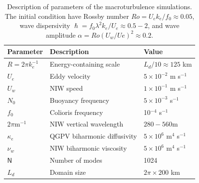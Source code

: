 \documentclass{jfm}
\begin{document}
 \begin{table}
  \begin{center}
    \caption{Description of parameters of the macroturbulence simulations.
             The initial condition have Rossby number $Ro = U_e k_e/f_0 \approx
             0.05$, wave dispersivity $\hslash = f_0\lambda^2k_e/U_e
             \approx 0.5-2$, and wave amplitude $\alpha = Ro (U_w/Ue)^2 \approx 0.2$.}
    \label{parameters_turb}
    \begin{tabular}{ l | l | l }
      \hline
       Parameter & Description & Value \\
       \hline
       $R= 2\pi k_e^{-1}$ & Energy-containing scale & $L_d/10 \approx 125$ km \\
       $U_e$ & Eddy velocity & $5\times 10^{-2}$ m s$^{-1}$ \\
       $U_w$ & NIW speed & $1 \times 10^{-1}$ m s$^{-1}$ \\
       $N_0$ & Buoyancy frequency & $5 \times 10^{-3}$ s$^{-1}$\\
       $f_0$ & Colioris frequency & 10$^{-4}$ s$^{-1}$\\
       $2\pi$m$^{-1}$ & NIW vertical wavelength & $280-560$m \\
       $\kappa_e$ & QGPV biharmonic diffusivity & $5\times 10^{6}$ m$^4$ s$^{-1}$\\
       $\nu_w$ & NIW biharmonic viscosity & $ 5 \times 10^{6}$ m$^4$ s$^{-1}$\\
       $\mathsf{N}$   & Number of modes &  1024  \\
       $L_d$ & Domain size & $2\pi\times 200$ km \\
    \end{tabular}
  \end{center}
 \end{table}
\end{document}
